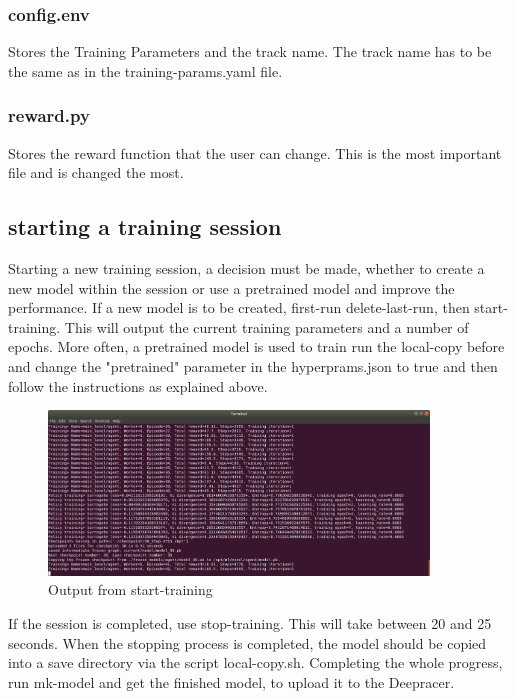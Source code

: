 \subsubsection{config.env}
Stores the Training Parameters and the track name. The track name has to be the same as in the training-params.yaml file.

\subsubsection{reward.py}
Stores the reward function that the user can change. This is the most important file and is changed the most.

\subsection{starting a training session}
Starting a new training session, a decision must be made, whether to create a new model within the session or use a pretrained model and improve the performance.
\newline If a new model is to be created, first-run delete-last-run, then start-training. This will output the current training parameters and a number of epochs.
\newline More often, a pretrained model is used to train run the local-copy before and change the "pretrained" parameter in the hyperprams.json to true and then follow the instructions as explained above.

\begin{figure}[H]
    \centering
    \includegraphics[width=0.9\textwidth]{images/deepracer_local_session1_1_console.png}
    \caption[]{Output from start-training\footnotemark}
    \label{fig:console-output-start}
\end{figure}

If the session is completed, use stop-training. This will take between 20 and 25 seconds. When the stopping process is completed, the model should be copied into a save directory via the script local-copy.sh. Completing the whole progress, run mk-model and get the finished model, to upload it to the Deepracer.

